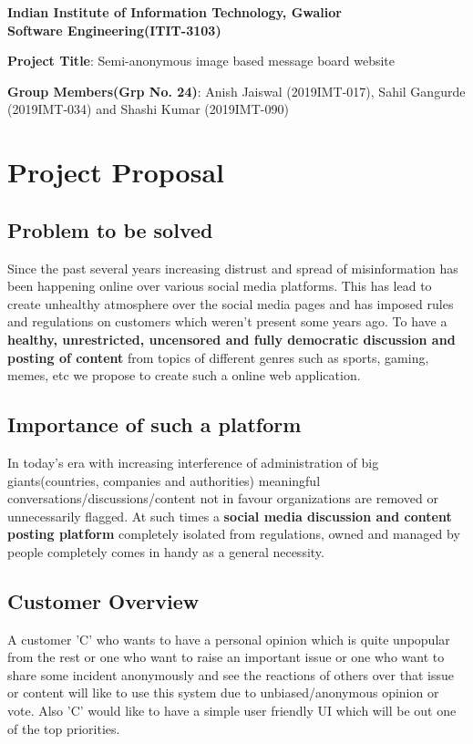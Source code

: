 \documentclass[12pt]{article}
\begin{document}
\begin{center}

\textbf{Indian Institute of Information Technology, Gwalior \\ Software Engineering(ITIT-3103)}

\vspace{0.5cm}

\textbf{Project Title}: Semi-anonymous image based message board website
\vspace{0.5cm}

\textbf{Group Members(Grp No. 24)}: Anish Jaiswal (2019IMT-017), Sahil Gangurde (2019IMT-034) and Shashi Kumar (2019IMT-090) 

\end{center}

\section{Project Proposal}

\subsection{Problem to be solved}
Since the past several years increasing distrust and spread of misinformation has been happening online over various social media platforms. This has lead to create unhealthy atmosphere over the social media pages and has imposed rules and regulations on customers which weren't present some years ago. To have a \textbf{healthy, unrestricted, uncensored and fully democratic discussion and posting of content} from topics of different genres such as sports, gaming, memes, etc we propose to create such a online web application.

\subsection{Importance of such a platform}
In today's era with increasing interference of administration of big giants(countries, companies and authorities) meaningful conversations/discussions/content not in favour organizations are removed or unnecessarily flagged. At such times a \textbf{social media discussion and content posting platform} completely isolated from regulations, owned and managed by people completely comes in handy as a general necessity.

\subsection{Customer Overview}
A customer 'C' who wants to have a personal opinion which is quite unpopular from the rest or one who want to raise an important issue or one who want to share some incident anonymously and see the reactions of others over that issue or content will like to use this system due to unbiased/anonymous opinion or vote. Also 'C' would like to have a simple user friendly UI which will be out one of the top priorities.
\end{document}

